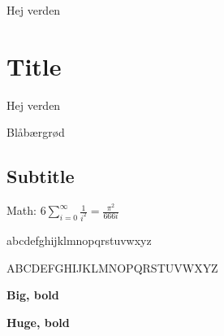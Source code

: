 \documentclass[a4paper, danish]{article}
\begin{document}
Hej verden


\section{Title}

{\large Hej verden\par}

{\large Bl\aa b\ae rgr\o d\par}

\subsection {Subtitle}

Math: $6\sum_{i=0}^\infty \frac{1}{i^2} = \frac{\pi^2}{666i}$

abcdefghijklmnopqrstuvwxyz

ABCDEFGHIJKLMNOPQRSTUVWXYZ


{\large\bf Big, bold\par}

{\Huge\bf Huge, bold\par}
\end{document}
